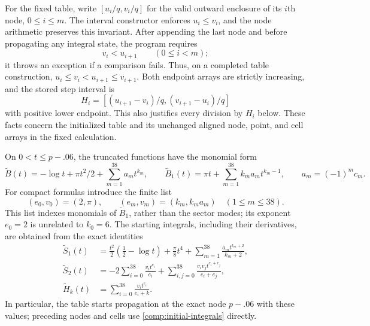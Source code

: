 For the fixed table, write $[u_i/q,v_i/q]$ for the valid outward
enclosure of its $i$th node, $0\le i\le m$.  The interval
constructor enforces $u_i\le v_i$, and the node arithmetic preserves
this invariant.  After appending the last node and before propagating
any integral state, the program requires
\begin{equation}\label{comp:node-separation}
                    v_i<u_{i+1}\qquad(0\le i<m);
\end{equation}
it throws an exception if a comparison fails.  Thus, on a completed
table construction,
$u_i\le v_i<u_{i+1}\le v_{i+1}$.  Both endpoint arrays are strictly
increasing, and the stored step interval is
\[
 H_i=[(u_{i+1}-v_i)/q,(v_{i+1}-u_i)/q]
\]
with positive lower endpoint.  This also justifies every division by
$H_i$ below.  These facts concern the initialized table and its
unchanged aligned node, point, and cell arrays in the fixed calculation.

On $0<t\le p-.06$, the truncated functions have the monomial form
\[
 \widetilde B(t)=-\log t+\pi t^2/2
       +\sum_{m=1}^{38}a_mt^{k_m},\qquad
 \widetilde B_1(t)=\pi t+\sum_{m=1}^{38}k_ma_mt^{k_m-1},
 \qquad a_m=(-1)^mc_m.
\]
For compact formulas introduce the finite list
\[
 (e_0,v_0)=(2,\pi),\qquad
 (e_m,v_m)=(k_m,k_ma_m)\quad(1\le m\le38).
\]
This list indexes monomials of $\widetilde B_1$, rather than the
sector modes; its exponent $e_0=2$ is unrelated to $k_0=6$.
The starting integrals, including their derivatives, are obtained
from the exact identities
\begin{equation}\label{comp:initial-integrals}
 \begin{split}
 \widetilde S_1(t)&=\frac{t^2}{2}\left(\frac12-\log t\right)
            +\frac\pi8t^4+
                  \sum_{m=1}^{38}\frac{a_mt^{k_m+2}}{k_m+2},\\
 \widetilde S_2(t)&=-2\sum_{i=0}^{38}\frac{v_it^{e_i}}{e_i}
            +\sum_{i,j=0}^{38}\frac{v_iv_jt^{e_i+e_j}}{e_i+e_j},\\
 \widetilde H_k(t)&=\sum_{i=0}^{38}\frac{v_it^{e_i}}{e_i+k}.
 \end{split}
\end{equation}
In particular, the table starts propagation at the exact node
$p-.06$ with these values; preceding nodes and cells use
\eqref{comp:initial-integrals} directly.


